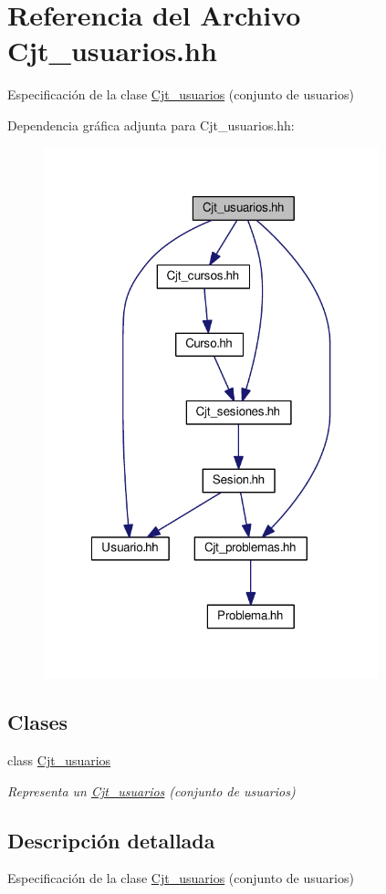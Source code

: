 \hypertarget{_cjt__usuarios_8hh}{}\section{Referencia del Archivo Cjt\+\_\+usuarios.\+hh}
\label{_cjt__usuarios_8hh}


Especificación de la clase \mbox{\hyperlink{class_cjt__usuarios}{Cjt\+\_\+usuarios}} (conjunto de usuarios)  


Dependencia gráfica adjunta para Cjt\+\_\+usuarios.\+hh\+:
\nopagebreak
\begin{figure}[H]
\begin{center}
\leavevmode
\includegraphics[width=275pt]{_cjt__usuarios_8hh__incl}
\end{center}
\end{figure}
\subsection*{Clases}
\begin{DoxyCompactItemize}
\item 
class \mbox{\hyperlink{class_cjt__usuarios}{Cjt\+\_\+usuarios}}
\begin{DoxyCompactList}\small\item\em Representa un \mbox{\hyperlink{class_cjt__usuarios}{Cjt\+\_\+usuarios}} (conjunto de usuarios) \end{DoxyCompactList}\end{DoxyCompactItemize}


\subsection{Descripción detallada}
Especificación de la clase \mbox{\hyperlink{class_cjt__usuarios}{Cjt\+\_\+usuarios}} (conjunto de usuarios) 

